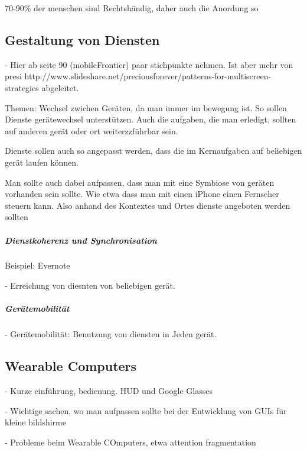 70-90\% der menschen sind Rechtshändig, daher auch die Anordung so


\subsection{Gestaltung von Diensten}
\label{sub:gestaltung_von_diensten}

- Hier ab seite 90 (mobileFrontier) paar stichpunkte nehmen. Ist aber mehr von presi http://www.slideshare.net/preciousforever/patterns-for-multiscreen-strategies abgeleitet. 

Themen: Wechsel zwichen Geräten, da man immer im bewegung ist. So sollen Dienste gerätewechsel unterstützen. Auch die aufgaben, die man erledigt, sollten auf anderen gerät oder ort weiterzzführbar sein.

Dienste sollen auch so angepasst werden, dass die im Kernaufgaben auf beliebigen gerät laufen können.

Man sollte auch dabei aufpassen, dass man mit eine Symbiose von geräten vorhanden sein sollte. Wie etwa dass man mit einen iPhone einen Fernseher steuern kann. Also anhand des Kontextes und Ortes dienste angeboten werden sollten

\subparagraph{Dienstkoherenz und Synchronisation}
\label{subp:diensmobilit_t}

Beispiel: Evernote

- Erreichung von diesnten von beliebigen gerät.


\subparagraph{Gerätemobilität} 
\label{subp:ger_temobilit_t}

- Gerätemobilität: Benutzung von diensten in Jeden gerät. 



\subsection{Wearable Computers} 
\label{sub:wearable_computers}

- Kurze einführung, bedienung. HUD und Google Glasses

- Wichtige sachen, wo man aufpassen sollte bei der Entwicklung von GUIs für kleine bildshirme

- Probleme beim Wearable COmputers, etwa attention fragmentation
